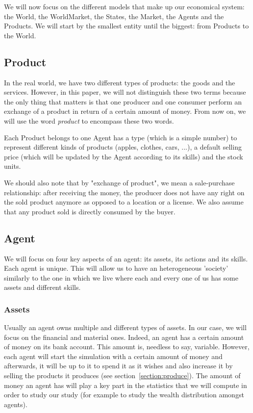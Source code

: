 We will now focus on the different models that make up our economical system: the World, the WorldMarket, the States, the Market, the Agents and the Products. We will start by the smallest entity until the biggest: from Products to the World.


\subsection{Product}\label{section:product}
In the real world, we have two different types of products: the goods and the services. However, in this paper, we will not distinguish these two terms because the only thing that matters is that one producer and one consumer perform an exchange of a product in return of a certain amount of money. From now on, we will use the word \emph{product} to encompass these two words.

Each Product belongs to one Agent has a type (which is a simple number) to represent different kinds of products (apples, clothes, cars, ...), a default selling price (which will be updated by the Agent according to its skills) and the stock units.

We should also note that by "exchange of product", we mean a sale-purchase relationship: after receiving the money, the producer does not have any right on the sold product anymore as opposed to a location or a license. We also assume that any product sold is directly consumed by the buyer.

\subsection{Agent}\label{section:agent}
We will focus on four key aspects of an agent: its assets, its actions and its skills. Each agent is unique. This will allow us to have an heterogeneous 'society' similarly to the one in which we live where each and every one of us has some assets and different skills.

    \subsubsection{Assets}\label{section:assets}
    Usually an agent owns multiple and different types of assets. In our case, we will focus on the financial and material ones. Indeed, an agent has a certain amount of money on its bank account. This amount is, needless to say, variable. 
    However, each agent will start the simulation with a certain amount of money and afterwards, it will be up to it to spend it as it wishes and also increase it by selling the products it produces (see section~\ref{section:produce}). 
    The amount of money an agent has will play a key part in the statistics that we will compute in order to study our study (for example to study the wealth distribution amongst agents). 

